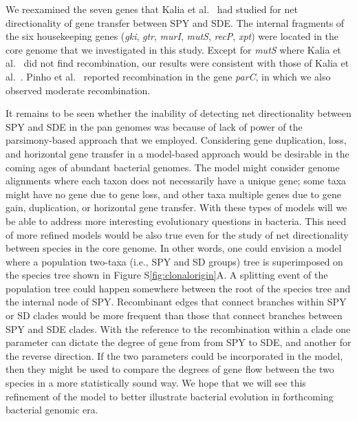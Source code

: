 \documentclass[10pt]{article}
\let\citet\cite
\begin{document}
We reexamined the seven genes that Kalia et al.\ \citet{Kalia2001} had studied
for net directionality of gene transfer between SPY and SDE.  The internal
fragments of the six housekeeping genes (\textit{gki}, \textit{gtr},
\textit{murI}, \textit{mutS}, \textit{recP}, \textit{xpt}) were located in the
core genome that we investigated in this study.  Except for \textit{mutS} where
Kalia et al.\ \citet{Kalia2001} did not find recombination, our results were
consistent with those of Kalia et al.\ \citet{Kalia2001}.  Pinho et al.\
\citet{Pinho2010} reported recombination in the gene \textit{parC}, in which we
also observed moderate recombination.

It remains to be seen whether the inability of detecting net directionality
between SPY and SDE in the pan genomes was because of lack of power of the
parsimony-based approach that we employed. Considering gene duplication, loss,
and horizontal gene transfer in a model-based approach would be desirable in the
coming ages of abundant bacterial genomes. The model might consider genome
alignments where each taxon does not necessarily have a unique gene; some taxa
might have no gene due to gene loss, and other taxa multiple genes due to gene
gain, duplication, or horizontal gene transfer. With these types of models will
we be able to address more interesting evolutionary questions in bacteria. This
need of more refined models would be also true even for the study of net
directionality between species in the core genome.  In other words, one could
envision a model where a population two-taxa (i.e., SPY and SD groups) tree is
superimposed on the species tree shown in Figure S\ref{fig:clonalorigin}A. A
splitting event of the population tree could happen somewhere between the root
of the species tree and the internal node of SPY. Recombinant edges that connect
branches within SPY or SD clades would be more frequent than those that connect
branches between SPY and SDE clades.  With the reference to the recombination
within a clade one parameter can dictate the degree of gene from from SPY to
SDE, and another for the reverse direction.  If the two parameters could be
incorporated in the model, then they might be used to compare the degrees of
gene flow between the two species in a more statistically sound way.  We hope
that we will see this refinement of the model to better illustrate bacterial
evolution in forthcoming bacterial genomic era.

\end{document}
